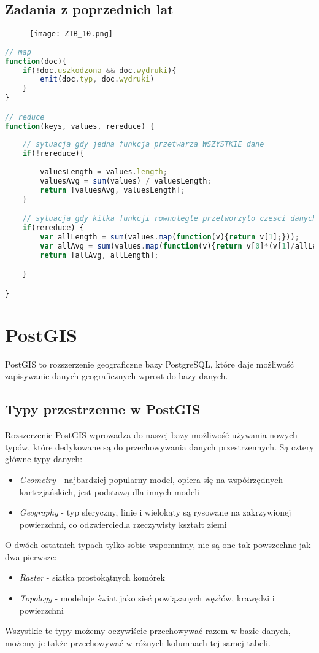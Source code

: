 \documentclass[a4paper,15pt]{article}
\newcommand{\egz}[2]{
    \begin{tcolorbox}[colback=mRed!5!white,colframe=mRed,title={Egzamin #1}]
        #2
    \end{tcolorbox}
}
\begin{document}
\subsection{Zadania z poprzednich lat}

\egz{}{
\begin{figure}[H]
\centering
  \texttt{[image: ZTB\_10.png]}
\end{figure}
}

\begin{lstlisting}[language=JavaScript]
// map
function(doc){
	if(!doc.uszkodzona && doc.wydruki){
		emit(doc.typ, doc.wydruki)
	}
}

// reduce
function(keys, values, rereduce) {
	
	// sytuacja gdy jedna funkcja przetwarza WSZYSTKIE dane
	if(!rereduce){
	
		valuesLength = values.length;
		valuesAvg = sum(values) / valuesLength;	
		return [valuesAvg, valuesLength];
	}

	// sytuacja gdy kilka funkcji rownolegle przetworzylo czesci danych 
	if(rereduce) {
		var allLength = sum(values.map(function(v){return v[1];}));
		var allAvg = sum(values.map(function(v){return v[0]*(v[1]/allLength);}));
		return [allAvg, allLength];

	}

}
\end{lstlisting}

\newpage
\section{PostGIS}

PostGIS to rozszerzenie geograficzne bazy PostgreSQL, które daje możliwość zapisywanie danych geograficznych wprost do bazy danych.

\subsection{Typy przestrzenne w PostGIS}

Rozszerzenie PostGIS wprowadza do naszej bazy możliwość używania nowych typów, które dedykowane są do przechowywania danych przestrzennych. Są cztery główne typy danych:
\begin{itemize}
\item \textit{Geometry} - najbardziej popularny model, opiera się na współrzędnych kartezjańskich, jest podstawą dla innych modeli
\item \textit{Geography} - typ sferyczny, linie i wielokąty są rysowane na zakrzywionej powierzchni, co odzwierciedla rzeczywisty kształt ziemi  
\end{itemize}
O dwóch ostatnich typach tylko sobie wspomnimy, nie są one tak powszechne jak dwa pierwsze:
\begin{itemize}
\item \textit{Raster} - siatka prostokątnych komórek
\item \textit{Topology} - modeluje świat jako sieć powiązanych węzłów, krawędzi i powierzchni
\end{itemize}
Wszystkie te typy możemy oczywiście przechowywać razem w bazie danych, możemy je także przechowywać w różnych kolumnach tej samej tabeli.
\end{document}
